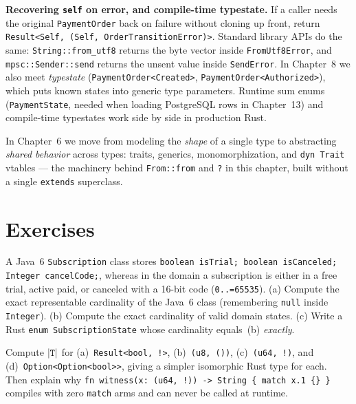 \begin{connectionbox}
\textbf{Recovering \texttt{self} on error, and compile-time typestate.} If a caller needs the original \texttt{PaymentOrder} back on failure without cloning up front, return \texttt{Result<Self, (Self, OrderTransitionError)>}. Standard library APIs do the same: \texttt{String::from\_utf8} returns the byte vector inside \texttt{FromUtf8Error}, and \texttt{mpsc::Sender::send} returns the unsent value inside \texttt{SendError}. In Chapter~8 we also meet \emph{typestate} (\texttt{PaymentOrder<Created>}, \texttt{PaymentOrder<Authorized>}), which puts known states into generic type parameters. Runtime sum enums (\texttt{PaymentState}, needed when loading PostgreSQL rows in Chapter~13) and compile-time typestates work side by side in production Rust.
\end{connectionbox}

In Chapter~6 we move from modeling the \emph{shape} of a single type to abstracting \emph{shared behavior} across types: traits, generics, monomorphization, and \texttt{dyn Trait} vtables --- the machinery behind \texttt{From::from} and \texttt{?} in this chapter, built without a single \texttt{extends} superclass.

\section{Exercises}
\label{ch05:exercises}

\begin{exercise}
\label{ch05:ex-cardinality}
A Java~6 \texttt{Subscription} class stores \texttt{boolean isTrial; boolean isCanceled; Integer cancelCode;}, whereas in the domain a subscription is either in a free trial, active paid, or canceled with a 16-bit code (\texttt{0..=65535}).
(a) Compute the exact representable cardinality of the Java~6 class (remembering \texttt{null} inside \texttt{Integer}).
(b) Compute the exact cardinality of valid domain states.
(c) Write a Rust \texttt{enum SubscriptionState} whose cardinality equals~(b) \emph{exactly}.
\end{exercise}

\begin{exercise}
\label{ch05:ex-never-algebra}
Compute $\lvert\texttt{T}\rvert$ for (a)~\texttt{Result<bool, !>}, (b)~\texttt{(u8, ())}, (c)~\texttt{(u64, !)}, and (d)~\texttt{Option<Option<bool>>}, giving a simpler isomorphic Rust type for each. Then explain why \texttt{fn witness(x: (u64, !)) -> String \{ match x.1 \{\} \}} compiles with zero \texttt{match} arms and can never be called at runtime.
\end{exercise}

